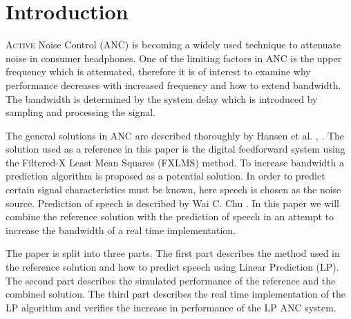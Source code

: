\section{Introduction}
\lettrine[lines=2]{A}{ctive} Noise Control (ANC) is becoming a widely used technique to attenuate noise in consumer headphones. One of the limiting factors in ANC is the upper frequency which is attenuated, therefore it is of interest to examine why performance decreases with increased frequency and how to extend bandwidth. The bandwidth is determined by the system delay which is introduced by sampling and processing the signal.   

The general solutions in ANC are described thoroughly by Hansen et al. \cite{Hansen2}, \cite{Hansen}. The solution used as a reference in this paper is the digital feedforward system using the Filtered-X Least Mean Squares (FXLMS) method. To increase bandwidth a prediction algorithm is proposed as a potential solution. In order to predict certain signal characteristics must be known, here speech is chosen as the noise source. Prediction of speech is described by Wai C. Chu \cite{Speech}. In this paper we will combine the reference solution with the prediction of speech in an attempt to increase the bandwidth of a real time implementation.  

The paper is split into three parts. The first part describes the method used in the reference solution and how to predict speech using Linear Prediction (LP). The second part describes the simulated performance of the reference and the combined solution. The third part describes the real time implementation of the LP algorithm and verifies the increase in performance of the LP ANC system.  
        








